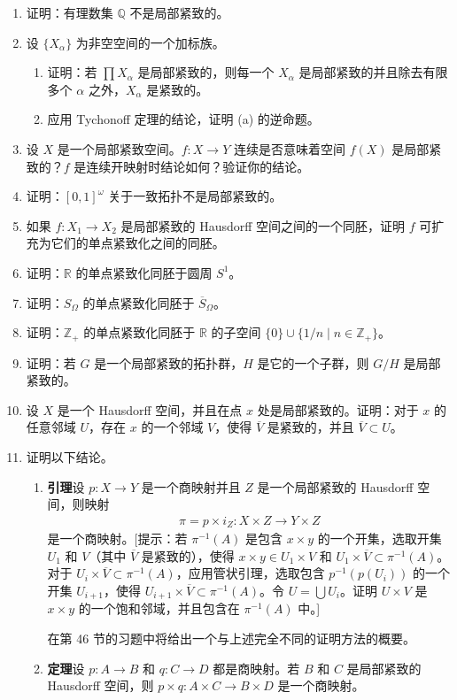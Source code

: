 \begin{enumerate}
\item 证明：有理数集 $\mathbb{Q}$ 不是局部紧致的。
\item 设 $\{X_{\alpha}\}$ 为非空空间的一个加标族。
\begin{enumerate}
\item 证明：若 $\prod X_{\alpha}$ 是局部紧致的，则每一个 $X_{\alpha}$ 是局部紧致的并且除去有限多个 $\alpha$ 之外，$X_{\alpha}$ 是紧致的。
\item 应用 Tychonoff 定理的结论，证明 (a) 的逆命题。
\end{enumerate}
\item 设 $X$ 是一个局部紧致空间。$f\colon X\to Y$ 连续是否意味着空间 $f(X)$ 是局部紧致的？$f$ 是连续开映射时结论如何？验证你的结论。
\item 证明：$[0,1]^{\omega}$ 关于一致拓扑不是局部紧致的。
\item 如果 $f\colon X_{1}\to X_{2}$ 是局部紧致的 Hausdorff 空间之间的一个同胚，证明 $f$ 可扩充为它们的单点紧致化之间的同胚。
\item 证明：$\mathbb{R}$ 的单点紧致化同胚于圆周 $S^{1}$。
\item 证明：$S_{\Omega}$ 的单点紧致化同胚于 $\overline{S}_{\Omega}$。
\item 证明：$\mathbb{Z}_{+}$ 的单点紧致化同胚于 $\mathbb{R}$ 的子空间 $\{0\}\cup\{1/n\mid n\in\mathbb{Z}_{+}\}$。
\item 证明：若 $G$ 是一个局部紧致的拓扑群，$H$ 是它的一个子群，则 $G/H$ 是局部紧致的。
\item 设 $X$ 是一个 Hausdorff 空间，并且在点 $x$ 处是局部紧致的。证明：对于 $x$ 的任意邻域 $U$，存在 $x$ 的一个邻域 $V$，使得 $\overline{V}$ 是紧致的，并且 $\overline{V}\subset U$。
\item 证明以下结论。
\begin{enumerate}
\item \textbf{引理}\quad 设 $p\colon X\to Y$ 是一个商映射并且 $Z$ 是一个局部紧致的 Hausdorff 空间，则映射
\begin{align*}
\pi=p\times i_{Z}\colon X\times Z\longrightarrow Y\times Z
\end{align*}
是一个商映射。[提示：若 $\pi^{-1}(A)$ 是包含 $x\times y$ 的一个开集，选取开集 $U_{1}$ 和 $V$（其中 $\overline{V}$ 是紧致的），使得 $x\times y\in U_{1}\times V$ 和 $U_{1}\times\overline{V}\subset\pi^{-1}(A)$。对于 $U_{i}\times\overline{V}\subset\pi^{-1}(A)$，应用管状引理，选取包含 $p^{-1}(p(U_{i}))$ 的一个开集 $U_{i+1}$，使得 $U_{i+1}\times\overline{V}\subset\pi^{-1}(A)$。令 $U=\bigcup U_{i}$。证明 $U\times V$ 是 $x\times y$ 的一个饱和邻域，并且包含在 $\pi^{-1}(A)$ 中。]

在第 46 节的习题中将给出一个与上述完全不同的证明方法的概要。
\item \textbf{定理}\quad 设 $p\colon A\to B$ 和 $q\colon C\to D$ 都是商映射。若 $B$ 和 $C$ 是局部紧致的 Hausdorff 空间，则 $p\times q\colon A\times C\to B\times D$ 是一个商映射。
\end{enumerate}
\end{enumerate}